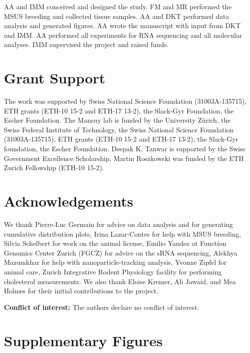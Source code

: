 \documentclass[12pt,twoside]{reedthesis}
\begin{document}
AA and IMM conceived and designed the study. FM and MR performed the MSUS breeding and collected tissue samples. AA and DKT performed data analysis and generated figures. AA wrote the manuscript with input from DKT and IMM. AA performed all
experiments for RNA sequencing and all molecular analyses. IMM supervised the project and raised funds.

\hypertarget{grant-support}{%
\section{Grant Support}\label{grant-support}}

The work was supported by Swiss National Science Foundation (31003A-135715), ETH grants (ETH-10 15-2 and ETH-17 13-2), the Slack-Gyr Foundation, the Escher Foundation. The Mansuy lab is funded by the University Zürich, the Swiss Federal Institute of Technology, the Swiss National Science Foundation (31003A-135715), ETH grants (ETH-10 15-2 and ETH-17 13-2), the Slack-Gyr foundation, the Escher Foundation. Deepak K. Tanwar is supported by the Swiss Government Excellence Scholarship. Martin Roszkowski was funded by the ETH Zurich Fellowship (ETH-10 15-2).

\hypertarget{acknowledgements}{%
\section{Acknowledgements}\label{acknowledgements}}

We thank Pierre-Luc Germain for advice on data analysis and for generating cumulative distribution plots, Irina Lazar-Contes for help with MSUS breeding, Silvia Schelbert for work on the animal license, Emilio Yandez at Function Genomics Center Zurich (FGCZ) for advice on the sRNA sequencing, Alekhya Mazumkhar for help with nanoparticle-tracking analysis, Yvonne Zipfel for animal care, Zurich Integrative Rodent Physiology facility for performing cholesterol measurements. We also thank Eloise Kremer, Ali Jawaid, and Mea Holmes for their initial contributions to the project.

\textbf{Conflict of interest:} The authors declare no conflict of interest.

\newpage

\hypertarget{supplementary-figures-1}{%
\section{Supplementary Figures}\label{supplementary-figures-1}}
\end{document}
